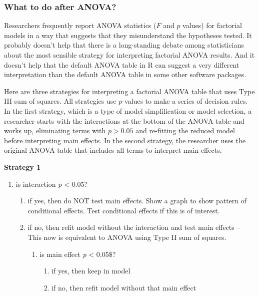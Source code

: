 \documentclass[]{book}
\providecommand{\tightlist}{%
  \setlength{\itemsep}{0pt}\setlength{\parskip}{0pt}}
\begin{document}
\subsubsection{What to do after ANOVA?}\label{what-to-do-after-anova}

Researchers frequently report ANOVA statistics (\(F\) and \(p\) values)
for factorial models in a way that suggests that they misunderstand the
hypotheses tested. It probably doesn't help that there is a
long-standing debate among statisticians about the most sensible
strategy for interpreting factorial ANOVA results. And it doesn't help
that the default ANOVA table in R can suggest a very different
interpretation than the default ANOVA table in some other software
packages.

Here are three strategies for interpreting a factorial ANOVA table that
uses Type III sum of squares. All strategies use \(p\)-values to make a
series of decision rules. In the first strategy, which is a type of
model simplification or model selection, a researcher starts with the
interactions at the bottom of the ANOVA table and works up, eliminating
terms with \(p > 0.05\) and re-fitting the reduced model before
interpreting main effects. In the second strategy, the researcher uses
the original ANOVA table that includes all terms to interpret main
effects.

\textbf{Strategy 1}

\begin{enumerate}
\def\labelenumi{\arabic{enumi}.}
\tightlist
\item
  is interaction \emph{p} \textless{} 0.05?

  \begin{enumerate}
  \def\labelenumii{\alph{enumii}.}
  \tightlist
  \item
    if yes, then do NOT test main effects. Show a graph to show pattern
    of conditional effects. Test conditional effects if this is of
    interest.
  \item
    if no, then refit model without the interaction and test main
    effects -- This now is equivalent to ANOVA using Type II sum of
    squares.

    \begin{enumerate}
    \def\labelenumiii{\arabic{enumiii}.}
    \setcounter{enumiii}{1}
    \tightlist
    \item
      is main effect \emph{p} \textless{} 0.05\$?

      \begin{enumerate}
      \def\labelenumiv{\alph{enumiv}.}
      \tightlist
      \item
        if yes, then keep in model
      \item
        if no, then refit model without that main effect
      \end{enumerate}
    \end{enumerate}
  \end{enumerate}
\end{enumerate}
\end{document}
